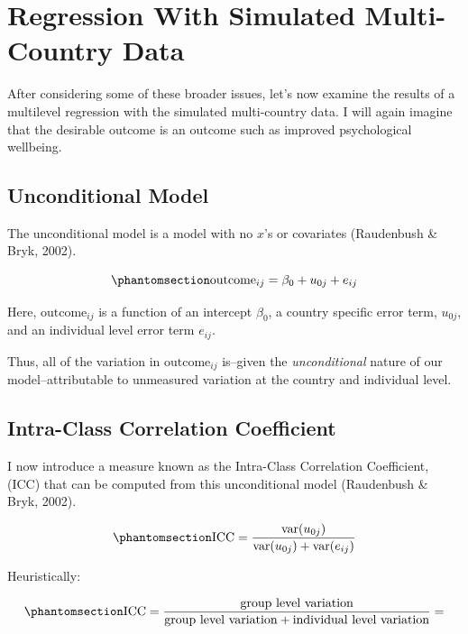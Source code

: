\documentclass[
  letterpaper,
  DIV=11,
  numbers=noendperiod]{scrreprt}
\begin{document}
\section{Regression With Simulated Multi-Country
Data}\label{sec-regression}

After considering some of these broader issues, let's now examine the
results of a multilevel regression with the simulated multi-country
data. I will again imagine that the desirable outcome is an outcome such
as improved psychological wellbeing.

\subsection{Unconditional Model}\label{sec-unconditional}

The unconditional model is a model with no \(x\)'s or covariates
(Raudenbush \& Bryk, 2002). 

\begin{equation}\phantomsection\label{eq-unconditional}{\text{outcome}_{ij} = \beta_0 + u_{0j} + e_{ij}}\end{equation}

Here, \(\text{outcome}_{ij}\) is a function of an intercept \(\beta_0\),
a country specific error term, \(u_{0j}\), and an individual level error
term \(e_{ij}\).

Thus, all of the variation in \(\text{outcome}_{ij}\) is--given the
\emph{unconditional} nature of our model--attributable to unmeasured
variation at the country and individual level.

\subsection{Intra-Class Correlation Coefficient}\label{sec-ICC}

I now introduce a measure known as the Intra-Class Correlation
Coefficient, (ICC) that can be computed from this unconditional model
(Raudenbush \& Bryk, 2002).  

\begin{equation}\phantomsection\label{eq-ICC}{\text{ICC} = \frac{\text{var}(u_{0j})}{\text{var}(u_{0j}) + \text{var}(e_{ij})}}\end{equation}

Heuristically:

\begin{equation}\phantomsection\label{eq-ICCheuristic}{\text{ICC} = \frac{\text{group level variation}}{\text{group level variation} + \text{individual level variation}} = }\end{equation}
\end{document}
